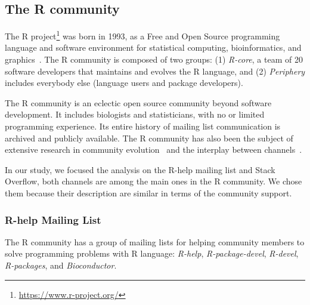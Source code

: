 \documentclass{sig-alternate-05-2015}
\begin{document}
\subsection{The R community}

The R project\footnote{\url{https://www.r-project.org/}} was born in 1993, as a Free and Open Source programming language and software environment for statistical computing, bioinformatics, and graphics~\cite{Ihaka1996}.
The R community is composed of two groups:
 (1) \textit{R-core}, a team of 20 software developers that maintains and evolves the R language, and
 (2) \textit{Periphery} includes everybody else (language users and package developers).

	The R community is an eclectic open source community beyond software development.
	It includes biologists and statisticians, with no or limited programming experience.
	Its entire history of mailing list communication is archived and publicly available.
	The R community has also been the subject of extensive research in community evolution~\cite{German2013} and the interplay between channels~\cite{Vasilescu2014c}.

    In our study, we focused the analysis on the R-help mailing list and Stack Overflow, both channels are among the main ones in the R community.
	We chose them because their description are similar in terms of the community support.

\subsubsection{R-help Mailing List}
    The R community has a group of mailing lists for helping community members to solve programming problems with R language: \emph{R-help}, \emph{R-package-devel}, \emph{R-devel}, \emph{R-packages}, and \emph{Bioconductor}.
\end{document}
